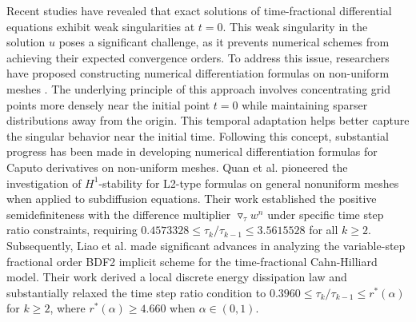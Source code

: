 \documentclass{siamart171218}
\theoremstyle{remark}
\theoremstyle{example}
\numberwithin{equation}{section}
\begin{document}
Recent studies have revealed that exact solutions of time-fractional differential equations exhibit weak singularities at $t=0$. This weak singularity in the solution $u$ poses a significant challenge, as it prevents numerical schemes from achieving their expected convergence orders. To address this issue, researchers have proposed constructing numerical differentiation formulas on non-uniform meshes \cite{Kopteva,Liao2020,Stynes2017}. The underlying principle of this approach involves concentrating grid points more densely near the initial point $t=0$ while maintaining sparser distributions away from the origin. This temporal adaptation helps better capture the singular behavior near the initial time.
Following this concept, substantial progress has been made in developing numerical differentiation formulas for Caputo derivatives on non-uniform meshes. Quan et al. \cite{Quan3} pioneered the investigation of $H^1$-stability for L2-type formulas on general nonuniform meshes when applied to subdiffusion equations. Their work established the positive semidefiniteness with the difference multiplier $\triangledown_\tau w^n$ under specific time step ratio constraints, requiring $0.4573328 \leq \tau_{k}/\tau_{k-1} \leq 3.5615528$ for all $k \geq 2$. Subsequently, Liao et al. \cite{Liao2024} made significant advances in analyzing the variable-step fractional order BDF2 implicit scheme for the time-fractional Cahn-Hilliard model. Their work derived a local discrete energy dissipation law and substantially relaxed the time step ratio condition to $0.3960 \leq \tau_{k}/\tau_{k-1} \leq r^*(\alpha)$ for $k \geq 2$, where $r^*(\alpha) \geq 4.660$ when $\alpha \in (0,1)$.
\end{document}
